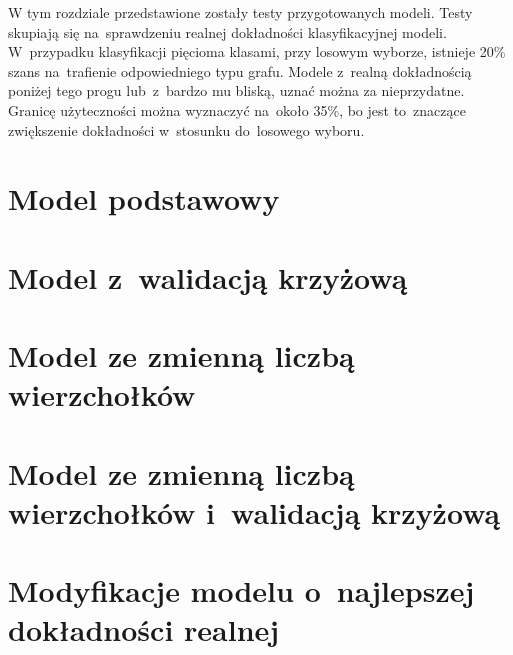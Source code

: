 W tym rozdziale przedstawione zostały testy przygotowanych modeli.
Testy skupiają się na~sprawdzeniu realnej dokładności klasyfikacyjnej modeli.
W~przypadku klasyfikacji pięcioma klasami, przy losowym wyborze, istnieje 20\% szans na~trafienie odpowiedniego typu grafu.
Modele z~realną dokładnością poniżej tego progu lub~z~bardzo mu bliską, uznać można za nieprzydatne.
Granicę użyteczności można wyznaczyć na~około 35\%, bo jest to~znaczące zwiększenie dokładności w~stosunku do~losowego wyboru.

\section{Model podstawowy}


\section{Model z~walidacją krzyżową}


\section{Model ze zmienną liczbą wierzchołków}


\section{Model ze zmienną liczbą wierzchołków i~walidacją krzyżową}


\section{Modyfikacje modelu o~najlepszej dokładności realnej}
